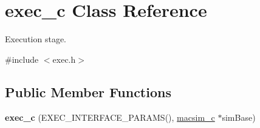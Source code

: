 \hypertarget{classexec__c}{
\section{exec\_\-c Class Reference}
\label{classexec__c}
}


Execution stage.  




{\ttfamily \#include $<$exec.h$>$}

\subsection*{Public Member Functions}
\begin{DoxyCompactItemize}
\item 
\hypertarget{classexec__c_a02c4af94633a3acb578c6b0b1a5da0af}{
{\bfseries exec\_\-c} (EXEC\_\-INTERFACE\_\-PARAMS(), \hyperlink{classmacsim__c}{macsim\_\-c} $\ast$simBase)}
\label{classexec__c_a02c4af94633a3acb578c6b0b1a5da0af}


\end{DoxyCompactItemize}
